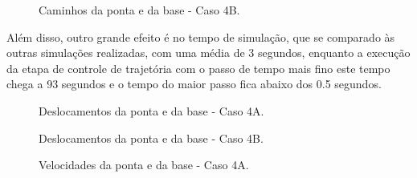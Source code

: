 
\begin{figure}[H]
    \centering
    \hfill
    \hfill
    \hfill
    \caption{Caminhos da ponta e da base - Caso 4B.}
    \label{fig:4B_cam}
\end{figure}

Além disso, outro grande efeito é no tempo de simulação, que se comparado às outras simulações realizadas, com uma média de 3 segundos, enquanto a execução da etapa de controle de trajetória com o passo de tempo mais fino este tempo chega a 93 segundos e o tempo do maior passo fica abaixo dos 0.5 segundos.


\begin{figure}[H]
    \centering
    \hfill
    \caption{Deslocamentos da ponta e da base - Caso 4A.}
    \label{fig:4A_des}
\end{figure}

\begin{figure}[H]
    \centering
    \hfill
    \caption{Deslocamentos da ponta e da base - Caso 4B.}
    \label{fig:4B_des}
\end{figure}

\begin{figure}[H]
    \centering
    \hfill
    \caption{Velocidades da ponta e da base - Caso 4A.}
    \label{fig:4A_vel}
\end{figure}

